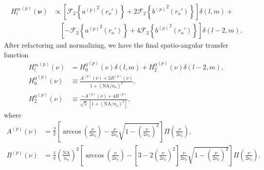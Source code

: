 \documentclass[11pt]{article}
\providecommand{\bs}[1]{\boldsymbol{#1}}
\begin{document}
\begin{align}
  {H_l^m}^{(p)}(\bs{\nu}) &\propto \left[\mathcal{F}_2\left\{{a^{(p)}}^2(r_o')\right\} + 2\mathcal{F}_2\left\{{b^{(p)}}^2(r_o')\right\}\right]\delta(l, m) + \\&\hspace{1em}\left[-\mathcal{F}_2\left\{{a^{(p)}}^2(r_o')\right\} + 4\mathcal{F}_2\left\{{b^{(p)}}^2(r_o')\right\}\right]\delta(l-2, m).
\end{align}
After refactoring and normalizing, we have the final spatio-angular transfer function
\begin{align}
  {H_l^m}^{(p)}(\nu) &= {H_0^0}^{(p)}(\nu)\delta(l, m) + {H_2^0}^{(p)}(\nu)\delta(l-2, m),\\
  {H_0^0}^{(p)}(\nu) &\equiv \frac{A^{(p)}(\nu) + 2B^{(p)}(\nu)}{1 + (\text{NA}/n_o)^2},\\
  {H_2^0}^{(p)}(\nu) &\equiv \frac{-A^{(p)}(\nu) + 4B^{(p)}}{\sqrt{5}\, [1 + (\text{NA}/n_o)^2]},
\end{align}
where
\begin{align}
  {A}^{(p)}(\nu) &= \frac{2}{\pi}\left[\arccos\left(\frac{\nu}{2\nu_o}\right) - \frac{\nu}{2\nu_o}\sqrt{1 - \left(\frac{\nu}{2\nu_o}\right)^2}\right]\Pi\left(\frac{\nu}{2\nu_o}\right),\\
  B^{(p)}(\nu) &= \frac{1}{\pi}\left(\frac{\text{NA}}{n_o}\right)^2\left[\arccos\left(\frac{\nu}{2\nu_o}\right) - \left[3 - 2\left(\frac{\nu}{2\nu_o}\right)^2\right]\frac{\nu}{2\nu_o} \sqrt{1 - \left(\frac{\nu}{2\nu_o}\right)^2}\right]\Pi\left(\frac{\nu}{2\nu_o}\right).                 
\end{align}
\end{document}
